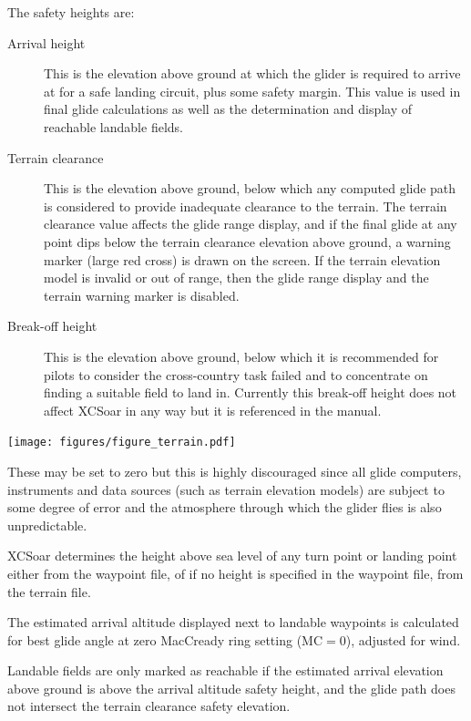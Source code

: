 The safety heights are:
\begin{description}
\item[Arrival height]  This is the elevation above ground at which
 the glider is required to arrive at for a safe landing circuit, plus
 some safety margin.  This value is used in final glide calculations as
 well as the determination and display of reachable landable fields.
\item[Terrain clearance]
 This is the elevation above ground, below which any computed glide
 path is considered to provide inadequate clearance to the terrain.
 The terrain clearance value affects the glide range display, and if
 the final glide at any point dips below the terrain clearance
 elevation above ground, a warning marker (large red cross) is drawn
 on the screen.  If the terrain elevation model is invalid or out of
 range, then the glide range display and the terrain warning marker is
 disabled.
\item[Break-off height]  This is the elevation above ground, below which 
 it is recommended for pilots to consider the cross-country task
 failed and to concentrate on finding a suitable field to land in.
 Currently this break-off height does not affect XCSoar in any way but
 it is referenced in the manual.
\end{description}

\begin{maxipage}
\begin{center}
\texttt{[image: figures/figure\_terrain.pdf]}
\end{center}
\end{maxipage}

\warning
These may be set to zero but this is highly discouraged since all
glide computers, instruments and data sources (such as terrain
elevation models) are subject to some degree of error and the
atmosphere through which the glider flies is also unpredictable.

XCSoar determines the height above sea level of any turn point or
landing point either from the waypoint file, of if no height is
specified in the waypoint file, from the terrain file.

The estimated arrival altitude displayed next to landable waypoints is
calculated for best glide angle at zero MacCready ring setting
(MC$=0$), adjusted for wind.

Landable fields are only marked as reachable if the estimated arrival
elevation above ground is above the arrival altitude safety height,
and the glide path does not intersect the terrain clearance safety
elevation.

